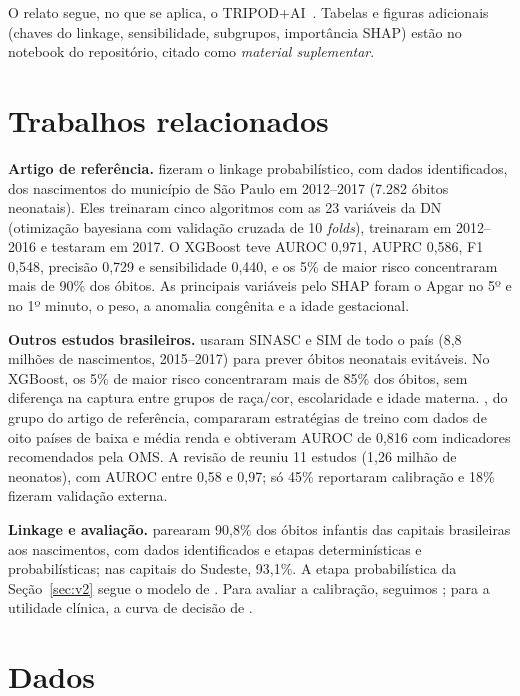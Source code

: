 \documentclass[12pt]{article}
\begin{document}
O relato segue, no que se aplica, o TRIPOD+AI~\cite{collins2024}. Tabelas e figuras adicionais (chaves do linkage, sensibilidade, subgrupos, importância SHAP) estão no notebook do repositório, citado como \emph{material suplementar}.

\section{Trabalhos relacionados}

\textbf{Artigo de referência.} \cite{batista2021} fizeram o linkage probabilístico, com dados identificados, dos nascimentos do município de São Paulo em 2012--2017 (7.282 óbitos neonatais). Eles treinaram cinco algoritmos com as 23 variáveis da DN (otimização bayesiana com validação cruzada de 10 \textit{folds}), treinaram em 2012--2016 e testaram em 2017. O XGBoost teve AUROC 0,971, AUPRC 0,586, F1 0,548, precisão 0,729 e sensibilidade 0,440, e os 5\% de maior risco concentraram mais de 90\% dos óbitos. As principais variáveis pelo SHAP foram o Apgar no 5º e no 1º minuto, o peso, a anomalia congênita e a idade gestacional.

\textbf{Outros estudos brasileiros.} \cite{ramos2025} usaram SINASC e SIM de todo o país (8,8 milhões de nascimentos, 2015--2017) para prever óbitos neonatais evitáveis. No XGBoost, os 5\% de maior risco concentraram mais de 85\% dos óbitos, sem diferença na captura entre grupos de raça/cor, escolaridade e idade materna. \cite{silva2025}, do grupo do artigo de referência, compararam estratégias de treino com dados de oito países de baixa e média renda e obtiveram AUROC de 0,816 com indicadores recomendados pela OMS. A revisão de \cite{mangold2021} reuniu 11 estudos (1,26 milhão de neonatos), com AUROC entre 0,58 e 0,97; só 45\% reportaram calibração e 18\% fizeram validação externa.

\textbf{Linkage e avaliação.} \cite{maia2017} parearam 90,8\% dos óbitos infantis das capitais brasileiras aos nascimentos, com dados identificados e etapas determinísticas e probabilísticas; nas capitais do Sudeste, 93,1\%. A etapa probabilística da Seção~\ref{sec:v2} segue o modelo de \cite{fellegi1969}. Para avaliar a calibração, seguimos \cite{vancalster2019}; para a utilidade clínica, a curva de decisão de \cite{vickers2006}.

\section{Dados}
\label{sec:dados}
\end{document}
